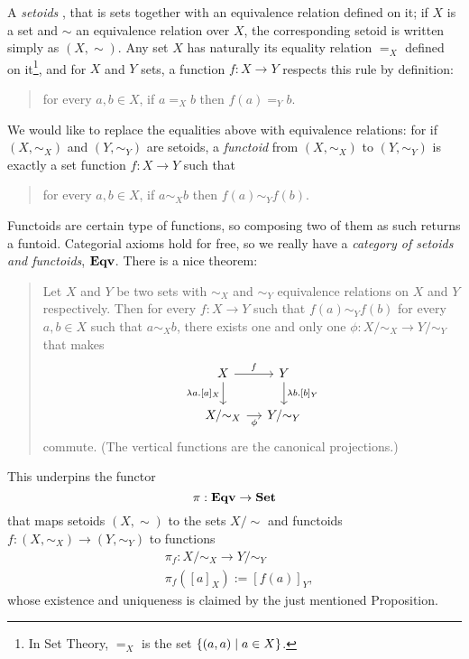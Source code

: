 \begin{example}
A {\em setoids} , that is sets together with an equivalence relation defined on it; if \(X\) is a set and \(\sim\) an equivalence relation over \(X\), the corresponding setoid is written simply as \((X, \sim)\). Any set \(X\) has naturally its equality relation \(=_X\) defined on it\footnote{In Set Theory, \(=_X\) is the set \(\left\{(a, a) \mid a \in X\right\}\).}, and for \(X\) and \(Y\) sets, a function \(f : X \to Y\) respects this rule by definition:
\begin{quotation}
for every \(a, b \in X\), if \(a =_X b\) then \(f(a) =_Y b\).
\end{quotation}
We would like to replace the equalities above with equivalence relations: for if \((X, \sim_X)\) and \((Y, \sim_Y)\) are setoids, a {\em functoid}  from \((X, \sim_X)\) to \((Y, \sim_Y)\) is exactly a set function \(f : X \to Y\) such that
\begin{quotation}
for every \(a, b \in X\), if \(a \sim_X b\) then \(f(a) \sim_Y f(b)\).
\end{quotation}
Functoids are certain type of functions, so composing two of them as such returns a funtoid. Categorial axioms hold for free, so we really have a {\em category of setoids and functoids}, \(\mathbf{Eqv}\).\newline
There is a nice theorem:
\begin{quotation}
Let \(X\) and \(Y\) be two sets with \(\sim_X\) and \(\sim_Y\) equivalence relations on \(X\) and \(Y\) respectively. Then for every \(f : X \to Y\) such that \(f(a) \sim_Y f(b)\) for every \(a, b \in X\) such that \(a \sim_X b\), there exists one and only one \(\phi : X{/}{\sim_X} \to Y{/}{\sim_Y}\) that makes
\[\begin{tikzcd}[column sep=small]
X \ar["f", r] \ar["{\lambda a.[a]_X}", d, swap] & Y \ar["{\lambda b.[b]_Y}", d] \\
X{/}{\sim_X} \ar["\phi", r, swap] & Y{/}{\sim_Y}
\end{tikzcd}\]
commute. (The vertical functions are the canonical projections.)
\end{quotation}
This underpins the functor
\[\pi : \mathbf{Eqv} \to \mathbf{Set}\]
that maps setoids \((X, \sim)\) to the sets \(X{/}{\sim}\) and functoids \(f : (X, \sim_X) \to (Y, \sim_Y)\) to functions
\[\begin{aligned}
& \pi_f : X{/}{\sim_X} \to Y{/}{\sim_Y} \\
& \pi_f \left([a]_X\right) := \left[f(a)\right]_Y ,
\end{aligned}\]
whose existence and uniqueness is claimed by the just mentioned Proposition.
\end{example}

